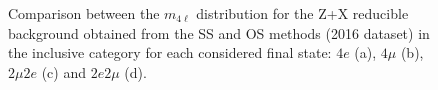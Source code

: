 \begin{figure}[h]
\begin{center}
\caption{Comparison between the $m_{4\ell}$ distribution for the Z+X reducible background obtained from the SS and OS methods (2016 dataset) in the inclusive category for each considered final state: $4e$ (a), $4\mu$ (b), $2\mu2e$ (c) and $2e2\mu$ (d).}
\label{fig:inclusiveComparison}
\end{center}
\end{figure}



